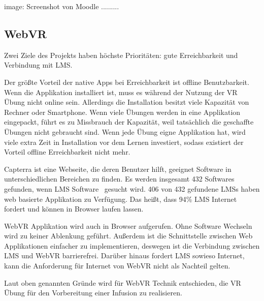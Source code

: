  image: Screenshot von Moodle .........

 \subsection{WebVR}
 Zwei Ziele des Projekts haben höchste Prioritäten: gute Erreichbarkeit und Verbindung mit LMS.

 Der größte Vorteil der native Apps bei Erreichbarkeit ist offline Benutzbarkeit. Wenn die Applikation installiert ist, muss es während der Nutzung der VR Übung nicht online sein. Allerdings die Installation besitzt viele Kapazität von Rechner oder Smartphone. Wenn viele Übungen werden in eine Applikation eingepackt, führt es zu Missbrauch der Kapazität, weil tatsächlich die geschaffte Übungen nicht gebraucht sind. Wenn jede Übung eigne Applikation hat, wird viele extra Zeit in Installation vor dem Lernen investiert, sodass existiert der Vorteil offline Erreichbarkeit nicht mehr.

 Capterra ist eine Webseite, die deren Benutzer hilft, geeignet Software in unterschiedlichen Bereichen zu finden. Es werden insgesamt 432 Softwares gefunden, wenn \glqq LMS Software \grqq\ gesucht wird. 406 von 432 gefundene LMSs haben web basierte Applikation zu Verfügung. Das heißt, dass 94\% LMS Internet fordert und können in Browser laufen lassen.

 WebVR Applikation wird auch in Browser aufgerufen. Ohne Software Wechseln wird zu keiner Ablenkung geführt. Außerdem ist die Schnittstelle zwischen Web Applikationen einfacher zu implementieren, deswegen ist die Verbindung zwischen LMS und WebVR barrierefrei. Darüber hinaus fordert LMS sowieso Internet, kann die Anforderung für Internet von WebVR nicht als Nachteil gelten. 

 Laut oben genannten Gründe wird für WebVR Technik entschieden, die VR Übung für den Vorbereitung einer Infusion zu realisieren.

